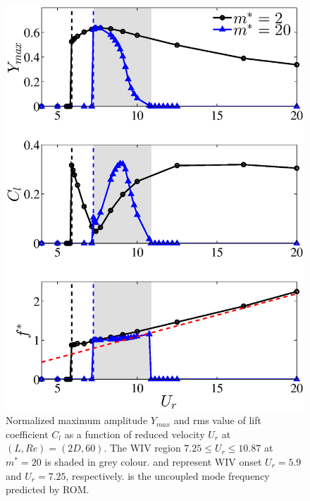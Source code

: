 \begin{figure}
	 \centering
	 \includegraphics[scale=0.45]{fom_circle_m2_20}
     \caption{Normalized maximum amplitude $Y_{max}$ and 
        rms value of lift coefficient $C_l$
         as a function of reduced velocity $U_r$ at $(L,Re)=(2D,60)$. 
        The WIV region $7.25 \le U_{r} \le 10.87$ at $m^*=20$ is shaded in grey colour.
        {\protect\blackdash} and {\protect\bluedash} represent WIV onset $U_r=5.9$ 
        and $U_r=7.25$, respectively. {\protect\reddash} is the uncoupled mode frequency predicted by ROM.}
\label{fig:fom_2_ycl}
\end{figure}



